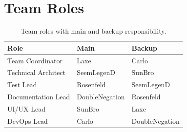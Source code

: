 \section{Team Roles}
\label{sec:roles}

\begin{table}[htbp]
  \centering
  \begin{tabular}{@{}lll@{}}
    \toprule
    \textbf{Role} & \textbf{Main} & \textbf{Backup} \\
    \midrule
    Team Coordinator    & Laxe           & Carlo          \\
    Technical Architect & SeemLegenD     & SunBro         \\
    Test Lead           & Rosenfeld         & SeemLegenD     \\
    Documentation Lead  & DoubleNegation & Rosenfeld         \\
    UI/UX Lead          & SunBro         & Laxe           \\
    DevOps Lead         & Carlo          & DoubleNegation \\
    \bottomrule
  \end{tabular}
  \caption{Team roles with main and backup responsibility.}
  \label{tab:roles}
\end{table}
